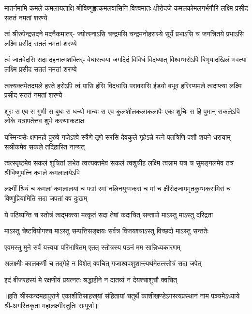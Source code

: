 


\fourlineindentedshloka
{मातर्नमामि कमले कमलायताक्षि}
{श्रीविष्णुहृत्कमलवासिनि विश्वमातः}
{क्षीरोदजे कमलकोमलगर्भगौरि}
{लक्ष्मि प्रसीद सततं नमतां शरण्ये}%

\fourlineindentedshloka
{त्वं श्रीरुपेन्द्रसदने मदनैकमातर्-}
{ज्योत्स्नाऽसि चन्द्रमसि चन्द्रमनोहरास्ये}
{सूर्ये प्रभाऽसि च जगत्त्रितये प्रभाऽसि}
{लक्ष्मि प्रसीद सततं नमतां शरण्ये}%
 

\fourlineindentedshloka
{त्वं जातवेदसि सदा दहनात्मशक्तिर्-}
{वेधास्त्वया जगदिदं विविधं विदध्यात्}
{विश्वम्भरोऽपि बिभृयादखिलं भवत्या}
{लक्ष्मि प्रसीद सततं नमतां शरण्ये}%

\fourlineindentedshloka
{त्वत्त्यक्तमेतदमले हरते हरोऽपि}
{त्वं पासि हंसि विदधासि परावरासि}
{ईड्यो बभूव हरिरप्यमले त्वदाप्त्या}
{लक्ष्मि प्रसीद सततं नमतां शरण्ये}%

\fourlineindentedshloka
{शूरः स एव स गुणी स बुधः स धन्यो}
{मान्यः स एव कुलशीलकलाकलापैः}
{एकः शुचिः स हि पुमान् सकलेऽपि लोके}
{यत्रापतेत्तव शुभे करुणाकटाक्षः}%

\fourlineindentedshloka
{यस्मिन्वसेः क्षणमहो पुरुषे गजेऽश्वे}
{स्त्रैणे तृणे सरसि देवकुले गृहेऽन्ने}
{रत्ने पतत्रिणि पशौ शयने धरायाम्}
{सश्रीकमेव सकले तदिहास्ति नान्यत्}%

\fourlineindentedshloka
{त्वत्स्पृष्टमेव सकलं शुचितां लभेत}
{त्वत्त्यक्तमेव सकलं त्वशुचीह लक्ष्मि}
{त्वन्नाम यत्र च सुमङ्गलमेव तत्र}
{श्रीविष्णुपत्नि कमले कमलालयेऽपि}%

\fourlineindentedshloka
{लक्ष्मीं श्रियं च कमलां कमलालयां च}
{पद्मां रमां नलिनयुग्मकरां च मां च}
{क्षीरोदजाममृतकुम्भकरामिरां च}
{विष्णुप्रियामिति सदा जपतां क्व दुःखम्}%

\twolineshloka
{ये पठिष्यन्ति च स्तोत्रं त्वद्भक्त्या मत्कृतं सदा}
{तेषां कदाचित् सन्तापो माऽस्तु माऽस्तु दरिद्रता}%

\twolineshloka
{माऽस्तु चेष्टवियोगश्च माऽस्तु सम्पत्तिसङ्क्षयः}
{सर्वत्र विजयश्चाऽस्तु विच्छदो माऽस्तु सन्ततेः}%


\twolineshloka
{एवमस्तु मुने सर्वं यत्त्वया परिभाषितम्}
{एतत् स्तोत्रस्य पठनं मम सान्निध्यकारणम्}%

\twolineshloka
{अलक्ष्मीः कालकर्णी च तद्गेहे न विशेत् क्वचित्}
{गजाश्वपशुशान्त्यर्थमेतत्स्तोत्रं सदा जपेत्}%

\twolineshloka
{इदं बीजरहस्यं मे रक्षणीयं प्रयत्नतः}
{श्रद्धाहीने न दातव्यं न देयश्चाशुचौ क्वचित्}%

॥इति श्रीस्कन्दमहापुराणे एकाशीतिसाहस्र्यां संहितायां चतुर्थे काशीखण्डेऽगस्त्यप्रस्थानं नाम पञ्चमेऽध्याये श्री-अगस्तिकृता महालक्ष्मीस्तुतिः सम्पूर्णा॥

